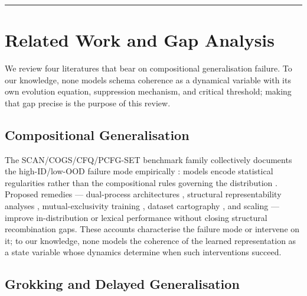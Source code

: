 \documentclass{article}
\theoremstyle{definition}
\begin{document}
\noindent\rule{\linewidth}{0.4pt}

\section{Related Work and Gap Analysis}\label{sec:related-work}

We review four literatures that bear on compositional generalisation
failure. To our knowledge, none models schema coherence as a dynamical
variable with its own evolution equation, suppression mechanism, and
critical threshold; making that gap precise is the purpose of this
review.

\subsection{Compositional Generalisation}\label{sec:compositional-generalisation}

The SCAN/COGS/CFQ/PCFG-SET benchmark family collectively documents the
high-ID/low-OOD failure mode empirically
\citep{mondorf2026compositionalarc}: models encode statistical
regularities rather than the compositional rules governing the
distribution \citep{lake2018generalizationwithoutsystematicity,
kim2020cogscompositionalgeneralizationchallenge,hupkes2020compositionalitydecomposed}.
Proposed remedies --- dual-process architectures
\citep{noviello2025neuroscienceinspiredualprocess}, structural
representability analyses \citep{bruns2025exploringcompositionalgeneralizationin},
mutual-exclusivity training \citep{jiang2022mutualexclusivity}, dataset
cartography \citep{swayamdipta2020datasetcartography}, and scaling
\citep{redhardt2025} --- improve in-distribution or lexical performance
without closing structural recombination gaps. These accounts
characterise the failure mode or intervene on it; to our knowledge,
none models the coherence of the learned representation as a state
variable whose dynamics determine when such interventions succeed.

\subsection{Grokking and Delayed Generalisation}\label{sec:grokking}
\end{document}
